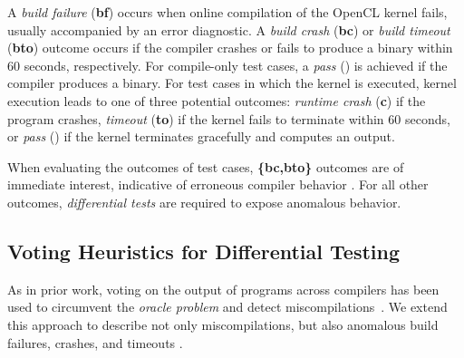 A \emph{build failure} (\textbf{bf}) occurs when online compilation of the OpenCL kernel fails, usually accompanied by an error diagnostic. A \emph{build crash} (\textbf{bc}) or \emph{build timeout} (\textbf{bto}) outcome occurs if the compiler crashes or fails to produce a binary within 60 seconds, respectively. For compile-only test cases, a \emph{pass} (\textbf{\cmark}) is achieved if the compiler produces a binary. For test cases in which the kernel is executed, kernel execution leads to one of three potential outcomes: \emph{runtime crash} (\textbf{c}) if the program crashes, \emph{timeout} (\textbf{to}) if the kernel fails to terminate within 60 seconds, or \emph{pass} (\textbf{\cmark}) if the kernel terminates gracefully and computes an output.
%

When evaluating the outcomes of test cases, \textbf{\{bc,bto\}} outcomes are of immediate interest, indicative of erroneous compiler behavior . For all other outcomes, \emph{differential tests} are required to expose anomalous behavior.


\subsection{Voting Heuristics for Differential Testing}

As in prior work, voting on the output of programs across compilers has been used to circumvent the \emph{oracle problem} and detect miscompilations~\cite{McKeeman1998}.
We extend this approach to describe not only miscompilations, but also anomalous build failures, crashes, and timeouts .

